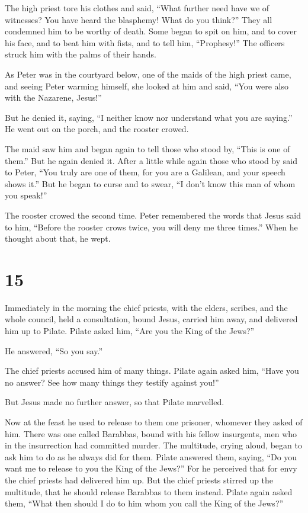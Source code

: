  The high priest tore his clothes and said, ``What further
need have we of witnesses?  You have heard the blasphemy!
What do you think?'' They all condemned him to be worthy of death.
 Some began to spit on him, and to cover his face, and to
beat him with fists, and to tell him, ``Prophesy!'' The officers struck
him with the palms of their hands.

 As Peter was in the courtyard below, one of the maids of
the high priest came,  and seeing Peter warming himself,
she looked at him and said, ``You were also with the Nazarene, Jesus!''

 But he denied it, saying, ``I neither know nor understand
what you are saying.'' He went out on the porch, and the rooster crowed.

 The maid saw him and began again to tell those who stood
by, ``This is one of them.''  But he again denied it. After
a little while again those who stood by said to Peter, ``You truly are
one of them, for you are a Galilean, and your speech shows it.''
 But he began to curse and to swear, ``I don't know this
man of whom you speak!''

 The rooster crowed the second time. Peter remembered the
words that Jesus said to him, ``Before the rooster crows twice, you will
deny me three times.'' When he thought about that, he wept.

\hypertarget{section-14}{%
\section{15}\label{section-14}}

 Immediately in the morning the chief priests, with the
elders, scribes, and the whole council, held a consultation, bound
Jesus, carried him away, and delivered him up to Pilate. 
Pilate asked him, ``Are you the King of the Jews?''

He answered, ``So you say.''

 The chief priests accused him of many things. 
Pilate again asked him, ``Have you no answer? See how many things they
testify against you!''

 But Jesus made no further answer, so that Pilate marvelled.

 Now at the feast he used to release to them one prisoner,
whomever they asked of him.  There was one called Barabbas,
bound with his fellow insurgents, men who in the insurrection had
committed murder.  The multitude, crying aloud, began to ask
him to do as he always did for them.  Pilate answered them,
saying, ``Do you want me to release to you the King of the Jews?''
 For he perceived that for envy the chief priests had
delivered him up.  But the chief priests stirred up the
multitude, that he should release Barabbas to them instead.
 Pilate again asked them, ``What then should I do to him
whom you call the King of the Jews?''

